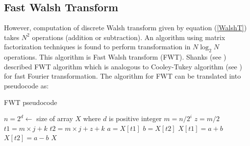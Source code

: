 \subsection{Fast Walsh Transform}
However, computation of discrete Walsh transform given by equation (\ref{WalshT}) takes $N^2$ operations (addition or subtraction).
An algorithm using matrix factorization techniques is found to perform transformation in $N \log_2 N$ operations.
This algorithm is Fast Walsh transform (FWT). Shanks (see \cite{Shanks1969}) described FWT algorithm which is analogous to 
Cooley-Tukey algorithm (see \cite{CooleyTukey1965}) for fast Fourier transformation.
The algorithm for FWT can be translated into pseudocode as:
\begin{algorithm}[ht]
\caption{FWT pseudocode}
\label{FWTpseudo}
\begin{algorithmic}[1]

\State $n = 2^d   \gets $  size of array $X$ where $d$ is positive integer
\State $m = n/2^i$
\State $z = m/2$
\State $t1 = m \times j + k$
\State $t2 = m \times j + z +k$
\State $a = X[t1]$
\State $b= X[t2]$
\State $X[t1] = a + b$
\State $X[t2] = a - b$
\EndFor
\EndFor
\EndFor
\State \Return $X$
\EndProcedure
\end{algorithmic}
\end{algorithm}
  
\newpage